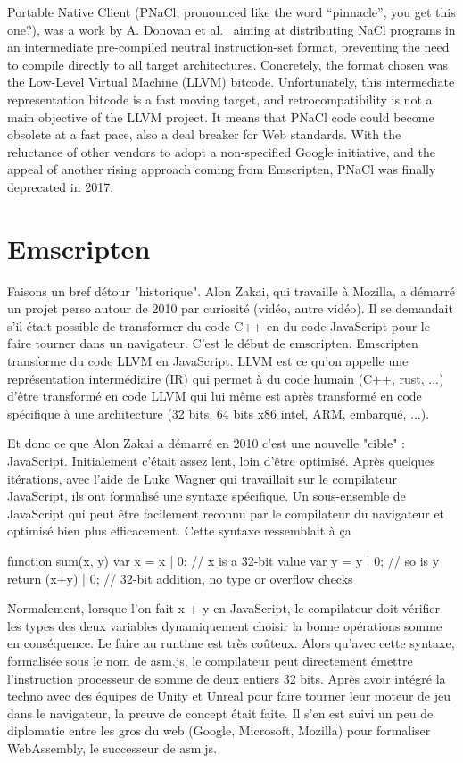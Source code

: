 Portable Native Client (PNaCl, pronounced like the word ``pinnacle'', you get this one?),
was a work by A. Donovan et al.~\cite{donovan2010pnacl} aiming at distributing
NaCl programs in an intermediate pre-compiled neutral instruction-set format,
preventing the need to compile directly to all target architectures.
Concretely, the format chosen was the Low-Level Virtual Machine (LLVM) bitcode.
Unfortunately, this intermediate representation bitcode is a fast moving target,
and retrocompatibility is not a main objective of the LLVM project.
It means that PNaCl code could become obsolete at a fast pace,
also a deal breaker for Web standards.
With the reluctance of other vendors to adopt a non-specified Google initiative,
and the appeal of another rising approach coming from Emscripten,
PNaCl was finally deprecated in 2017.


\section{Emscripten}%
\label{sec:Emscripten}

Faisons un bref détour "historique". Alon Zakai, qui travaille à Mozilla, a démarré un projet perso autour de 2010 par curiosité (vidéo, autre vidéo). Il se demandait s’il était possible de transformer du code C++ en du code JavaScript pour le faire tourner dans un navigateur. C’est le début de emscripten. Emscripten transforme du code LLVM en JavaScript. LLVM est ce qu’on appelle une représentation intermédiaire (IR) qui permet à du code humain (C++, rust, ...) d’être transformé en code LLVM qui lui même est après transformé en code spécifique à une architecture (32 bits, 64 bits x86 intel, ARM, embarqué, ...).

Et donc ce que Alon Zakai a démarré en 2010 c’est une nouvelle "cible" : JavaScript. Initialement c’était assez lent, loin d’être optimisé. Après quelques itérations, avec l’aide de Luke Wagner qui travaillait sur le compilateur JavaScript, ils ont formalisé une syntaxe spécifique. Un sous-ensemble de JavaScript qui peut être facilement reconnu par le compilateur du navigateur et optimisé bien plus efficacement. Cette syntaxe ressemblait à ça

function sum(x, y) {
    var x = x | 0;  // x is a 32-bit value
    var y = y | 0;  // so is y
    return (x+y) | 0; // 32-bit addition, no type or overflow checks
}

Normalement, lorsque l’on fait x + y en JavaScript, le compilateur doit vérifier les types des deux variables dynamiquement choisir la bonne opérations somme en conséquence. Le faire au runtime est très coûteux. Alors qu’avec cette syntaxe, formalisée sous le nom de asm.js, le compilateur peut directement émettre l’instruction processeur de somme de deux entiers 32 bits. Après avoir intégré la techno avec des équipes de Unity et Unreal pour faire tourner leur moteur de jeu dans le navigateur, la preuve de concept était faite. Il s’en est suivi un peu de diplomatie entre les gros du web (Google, Microsoft, Mozilla) pour formaliser WebAssembly, le successeur de asm.js.

